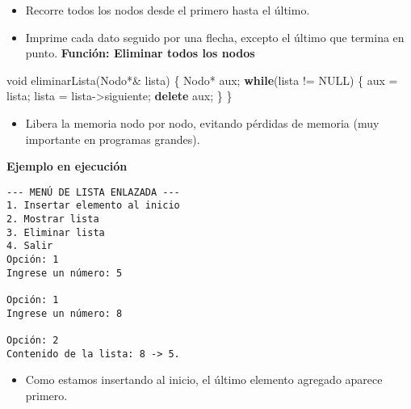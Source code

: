 \documentclass[
  11pt,
  a4paper,
  DIV=11,
  numbers=noendperiod]{scrreprt}
\newenvironment{Shaded}{\begin{snugshade}}{\end{snugshade}}
\newcommand{\ControlFlowTok}[1]{\textcolor[rgb]{0.00,0.23,0.31}{\textbf{#1}}}
\newcommand{\DataTypeTok}[1]{\textcolor[rgb]{0.68,0.00,0.00}{#1}}
\newcommand{\KeywordTok}[1]{\textcolor[rgb]{0.00,0.23,0.31}{\textbf{#1}}}
\newcommand{\NormalTok}[1]{\textcolor[rgb]{0.00,0.23,0.31}{#1}}
\newcommand{\OperatorTok}[1]{\textcolor[rgb]{0.37,0.37,0.37}{#1}}
\providecommand{\tightlist}{%
  \setlength{\itemsep}{0pt}\setlength{\parskip}{0pt}}
\begin{document}
\begin{itemize}
\tightlist
\item
  Recorre todos los nodos desde el primero hasta el último.
\item
  Imprime cada dato seguido por una flecha, excepto el último que
  termina en punto. \textbf{Función: Eliminar todos los nodos}
\end{itemize}

\begin{Shaded}
\begin{Highlighting}[]
\DataTypeTok{void}\NormalTok{ eliminarLista}\OperatorTok{(}\NormalTok{Nodo}\OperatorTok{*\&}\NormalTok{ lista}\OperatorTok{)} \OperatorTok{\{}
\NormalTok{    Nodo}\OperatorTok{*}\NormalTok{ aux}\OperatorTok{;}
    \ControlFlowTok{while}\OperatorTok{(}\NormalTok{lista }\OperatorTok{!=}\NormalTok{ NULL}\OperatorTok{)} \OperatorTok{\{}
\NormalTok{        aux }\OperatorTok{=}\NormalTok{ lista}\OperatorTok{;}
\NormalTok{        lista }\OperatorTok{=}\NormalTok{ lista}\OperatorTok{{-}\textgreater{}}\NormalTok{siguiente}\OperatorTok{;}
        \KeywordTok{delete}\NormalTok{ aux}\OperatorTok{;}
    \OperatorTok{\}}
\OperatorTok{\}}
\end{Highlighting}
\end{Shaded}

\begin{itemize}
\tightlist
\item
  Libera la memoria nodo por nodo, evitando pérdidas de memoria (muy
  importante en programas grandes).
\end{itemize}

\textbf{Ejemplo en ejecución}

\begin{tcolorbox}[custombox]
\begin{verbatim}
--- MENÚ DE LISTA ENLAZADA ---
1. Insertar elemento al inicio
2. Mostrar lista
3. Eliminar lista
4. Salir
Opción: 1
Ingrese un número: 5

Opción: 1
Ingrese un número: 8

Opción: 2
Contenido de la lista: 8 -> 5.
\end{verbatim}
\end{tcolorbox}

\begin{itemize}
\tightlist
\item
  Como estamos insertando al inicio, el último elemento agregado aparece
  primero.
\end{itemize}

\end{document}
